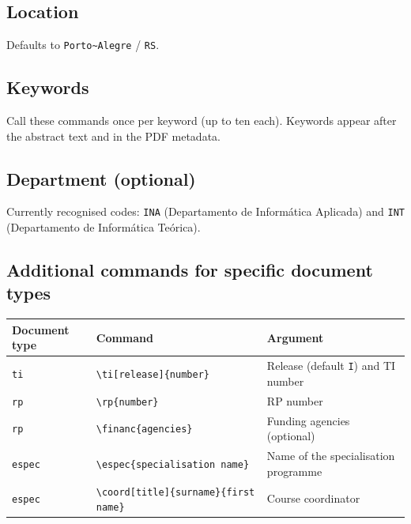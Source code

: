 \documentclass[11pt,a4paper]{article}
\newcommand{\opt}[1]{\texttt{#1}}
\newcommand{\cmd}[1]{\texttt{\textbackslash #1}}
\begin{document}
\subsection{Location}

\begin{latex}
\end{latex}

Defaults to \texttt{Porto\textasciitilde Alegre} / \texttt{RS}.

\subsection{Keywords}

\begin{latex}
\end{latex}

Call these commands once per keyword (up to ten each).  Keywords appear
after the abstract text and in the PDF metadata.

\subsection{Department (optional)}

\begin{latex}
\end{latex}

Currently recognised codes: \opt{INA} (Departamento de Informática
Aplicada) and \opt{INT} (Departamento de Informática Teórica).

\subsection{Additional commands for specific document types}

\begin{center}
\begin{tabular}{@{}lll@{}}
  \toprule
  Document type & Command & Argument \\
  \midrule
  \opt{ti}    & \cmd{ti}\texttt{[release]\{number\}}
              & Release (default \texttt{I}) and TI number \\
  \opt{rp}    & \cmd{rp}\texttt{\{number\}}
              & RP number \\
  \opt{rp}    & \cmd{financ}\texttt{\{agencies\}}
              & Funding agencies (optional) \\
  \opt{espec} & \cmd{espec}\texttt{\{specialisation name\}}
              & Name of the specialisation programme \\
  \opt{espec} & \cmd{coord}\texttt{[title]\{surname\}\{first name\}}
              & Course coordinator \\
  \bottomrule
\end{tabular}
\end{center}
\end{document}
